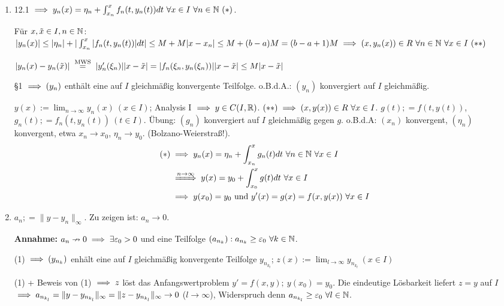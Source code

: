 \documentclass[a4paper,twoside,DIV15,BCOR12mm]{scrbook}
\begin{document}
\begin{beweis}
\begin{enumerate}
\item 12.1 $\folgt y_n(x) = \eta_n + \int_{x_n}^{x} f_n(t,y_n(t))dt \ \forall x\in I\ \forall n\in\MdN\ (*)$.

Für $x,\tilde x \in I, n\in\mathbb{N}$: $|y_n(x)|\le |\eta_n| + |\int_{x_n}^x|f_n(t,y_n(t))|dt|\le M + M|x-x_n| \le M + (b-a)M = (b-a+1)M \folgt (x,y_n(x) )\in R \ \forall n\in\MdN\ \forall x\in I \ (**)$

$|y_n(x) - y_n(\tilde x)| \gleichnach{MWS} |y_n'(\xi_n)||x-\tilde x| = |f_n(\xi_n, y_n(\xi_n))||x-\tilde x| \le M|x-\tilde x|$

§1 $\implies (y_n)$ enthält eine auf $I$ gleichmäßig konvergente Teilfolge. o.B.d.A.: $(y_n)$ konvergiert auf $I$ gleichmäßig.

$y(x) := \lim_{n\to\infty} y_n(x)\ (x\in I)$; Analysis I $\implies y\in C(I,\mathbb{R})$. $(**) \implies (x,y(x))\in R \ \forall x\in I$. $g(t) ;= f(t,y(t))$, $g_n(t) ;= f_n(t,y_n(t))\ (t\in I)$. Übung: $(g_n)$ konvergiert auf $I$ gleichmäßig gegen $g$. o.B.d.A: $(x_n)$ konvergent, $(\eta_n)$ konvergent, etwa $x_n\to x_0$, $\eta_n \to y_0$. (Bolzano-Weierstraß!).
\begin{align*}
(*) &\folgt y_n(x) = \eta_n + \int_{x_n}^x g_n(t)dt\ \forall n\in\MdN \ \forall x\in I\\
&\folgtwegen{n\to\infty} y(x) = y_0 + \int_{x_0}^x g(t)dt \ \forall x\in I\\
&\folgt y(x_0) = y_0 \text{ und } y'(x) = g(x) = f(x,y(x)) \ \forall x\in I
\end{align*}
\item $a_n ;= \|y-y_n\|_\infty$. Zu zeigen ist: $a_n\to0$.

\textbf{Annahme:} $a_n\nrightarrow 0 \implies \exists \varepsilon_0 >0$ und eine Teilfolge $(a_{n_k}): a_{n_k} \ge \varepsilon_0 \ \forall k\in\mathbb{N}$.

(1) $\implies (y_{n_k})$ enhält eine auf $I$ gleichmäßig konvergente Teilfolge $y_{n_{k_l}}$; $z(x) := \lim_{l\to\infty}y_{n_{k_l}}\ (x\in I)$

(1) + Beweis von (1) $\implies z$ löst das Anfangswertproblem $y'=f(x,y);\ y(x_0) = y_0$. Die eindeutige Lösbarkeit liefert $z=y$ auf $I$ $\implies a_{n_{k_l}} = \| y - y_{n_{k_l}}\|_\infty = \|z - y_{n_{k_l}}\|_\infty \to 0$ ($l\to\infty$), Widerspruch denn $a_{n_{k_l}}\ge \ep_0 \ \forall l\in\MdN$.
\end{enumerate}
\end{beweis}
\end{document}
